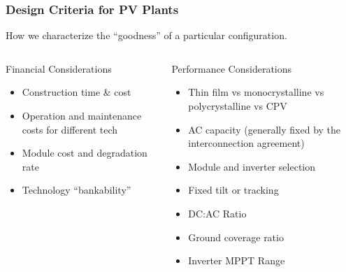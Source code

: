 \documentclass[aspectratio=169]{beamer}
\begin{document}
\begin{frame}
  \frametitle{Design Criteria for PV Plants}
  How we characterize the ``goodness'' of a particular configuration.
  \begin{columns}[t]
    \begin{block}{Financial Considerations}
      \begin{itemize}
      \item Construction time \& cost
      \item Operation and maintenance costs for different tech
      \item Module cost and degradation rate
      \item Technology ``bankability''
      \end{itemize}
    \end{block}

    \begin{block}{Performance Considerations}
      \begin{itemize}
      \item Thin film vs monocrystalline vs polycrystalline vs CPV
      \item AC capacity (generally fixed by the interconnection agreement)
      \item Module and inverter selection
      \item Fixed tilt or tracking
      \item DC:AC Ratio
      \item Ground coverage ratio
      \item Inverter MPPT Range
      \end{itemize}
    \end{block}
  \end{columns}
\end{frame}
\end{document}
